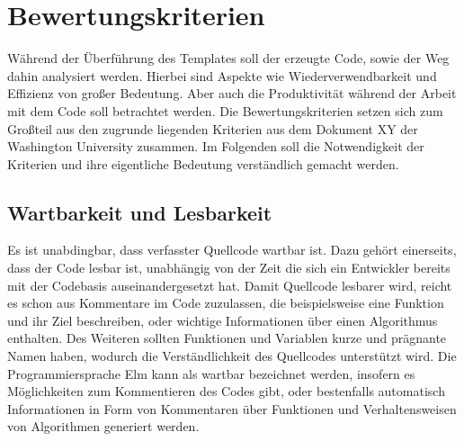 \section{Bewertungskriterien}
\label{sec:Bewertungskriterien}
Während der Überführung des Templates soll der erzeugte Code, sowie der Weg dahin analysiert werden. Hierbei sind Aspekte wie Wiederverwendbarkeit und Effizienz von großer Bedeutung. Aber auch die Produktivität während der Arbeit mit dem Code soll betrachtet werden. Die Bewertungskriterien setzen sich zum Großteil aus den zugrunde liegenden Kriterien aus dem Dokument XY der Washington University zusammen. Im Folgenden soll die Notwendigkeit der Kriterien und ihre eigentliche Bedeutung verständlich gemacht werden.




\subsection{Wartbarkeit und Lesbarkeit}
\label{sec:Wartbarkeit}
Es ist unabdingbar, dass verfasster Quellcode wartbar ist. Dazu gehört einerseits, dass der Code lesbar ist, unabhängig von der Zeit die sich ein Entwickler bereits mit der Codebasis auseinandergesetzt hat. Damit Quellcode lesbarer wird, reicht es schon aus Kommentare im Code zuzulassen, die beispielsweise eine Funktion und ihr Ziel beschreiben, oder wichtige Informationen über einen Algorithmus enthalten. Des Weiteren sollten Funktionen und Variablen kurze und prägnante Namen haben, wodurch die Verständlichkeit des Quellcodes unterstützt wird. Die Programmiersprache Elm kann als wartbar bezeichnet werden, insofern es Möglichkeiten zum Kommentieren des Codes gibt, oder bestenfalls automatisch Informationen in Form von Kommentaren über Funktionen und Verhaltensweisen von Algorithmen generiert werden.



